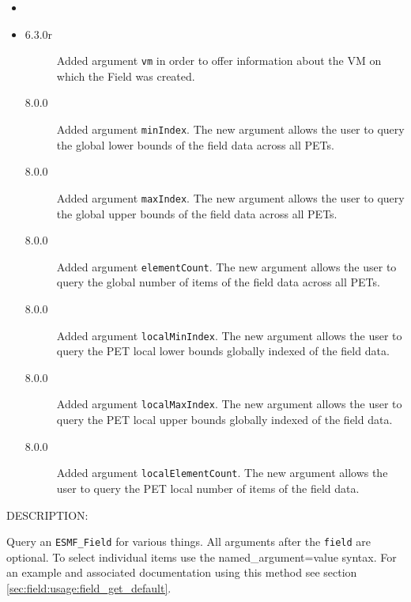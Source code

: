    \begin{itemize}
   \item{}
   \item{}
   \begin{description}
   \item[6.3.0r] Added argument {\tt vm} in order to offer information about the
   VM on which the Field was created.
   \item[8.0.0] Added argument {\tt minIndex}.
   The new argument allows the user to query the global lower bounds of the field data across all PETs.
   \item[8.0.0] Added argument {\tt maxIndex}.
   The new argument allows the user to query the global upper bounds of the field data across all PETs.
   \item[8.0.0] Added argument {\tt elementCount}.
   The new argument allows the user to query the global number of items of the field data across all PETs.
   \item[8.0.0] Added argument {\tt localMinIndex}.
   The new argument allows the user to query the PET local lower bounds globally indexed of the field data.
   \item[8.0.0] Added argument {\tt localMaxIndex}.
   The new argument allows the user to query the PET local upper bounds globally indexed of the field data.
   \item[8.0.0] Added argument {\tt localElementCount}.
   The new argument allows the user to query the PET local number of items of the field data.
   \end{description}
   \end{itemize}
  
{\sf DESCRIPTION:\\ }


   Query an {\tt ESMF\_Field} for various things. All arguments after
   the {\tt field} are optional. To select individual items use the
   named\_argument=value syntax. For an example and
   associated documentation using this method see section
   \ref{sec:field:usage:field_get_default}.
  
